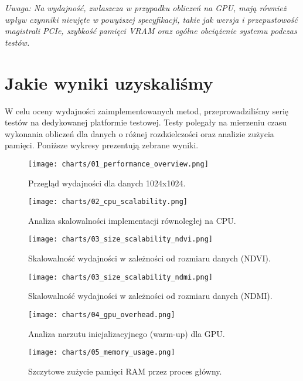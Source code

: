 \documentclass[12pt,a4paper]{article}
\begin{document}
\textit{Uwaga: Na wydajność, zwłaszcza w przypadku obliczeń na GPU, mają również wpływ czynniki nieujęte w powyższej specyfikacji, takie jak wersja i przepustowość magistrali PCIe, szybkość pamięci VRAM oraz ogólne obciążenie systemu podczas testów.}

\section{Jakie wyniki uzyskaliśmy}
W celu oceny wydajności zaimplementowanych metod, przeprowadziliśmy serię testów na dedykowanej platformie testowej. Testy polegały na mierzeniu czasu wykonania obliczeń dla danych o różnej rozdzielczości oraz analizie zużycia pamięci. Poniższe wykresy prezentują zebrane wyniki.

\begin{figure}[H]
    \centering
    \texttt{[image: charts/01\_performance\_overview.png]}
    \caption{Przegląd wydajności dla danych 1024x1024.}
    \label{fig:overview}
\end{figure}

\begin{figure}[H]
    \centering
    \texttt{[image: charts/02\_cpu\_scalability.png]}
    \caption{Analiza skalowalności implementacji równoległej na CPU.}
    \label{fig:cpu_scaling}
\end{figure}

\begin{figure}[H]
    \centering
    \texttt{[image: charts/03\_size\_scalability\_ndvi.png]}
    \caption{Skalowalność wydajności w zależności od rozmiaru danych (NDVI).}
    \label{fig:size_scaling_ndvi}
\end{figure}

\begin{figure}[H]
    \centering
    \texttt{[image: charts/03\_size\_scalability\_ndmi.png]}
    \caption{Skalowalność wydajności w zależności od rozmiaru danych (NDMI).}
    \label{fig:size_scaling_ndmi}
\end{figure}

\begin{figure}[H]
    \centering
    \texttt{[image: charts/04\_gpu\_overhead.png]}
    \caption{Analiza narzutu inicjalizacyjnego (warm-up) dla GPU.}
    \label{fig:gpu_overhead}
\end{figure}

\begin{figure}[H]
    \centering
    \texttt{[image: charts/05\_memory\_usage.png]}
    \caption{Szczytowe zużycie pamięci RAM przez proces główny.}
    \label{fig:memory}
\end{figure}
\end{document}
